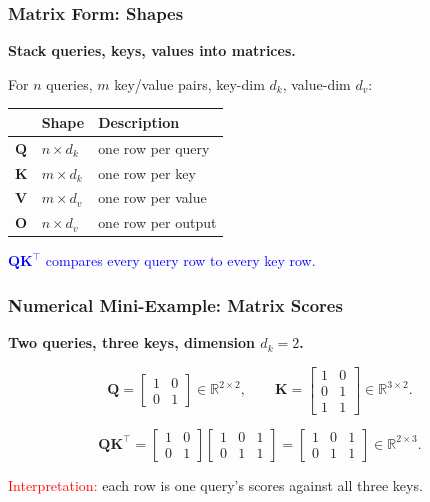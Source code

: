 \documentclass[notes,11pt, aspectratio=169]{beamer}
\newcommand{\vK}{\mathbf{K}}
\newcommand{\vQ}{\mathbf{Q}}
\newcommand{\vV}{\mathbf{V}}
\newcommand{\vO}{\mathbf{O}}
\newcommand{\R}{\mathbb{R}}
\begin{document}
\begin{frame}
\frametitle{Matrix Form: Shapes}

\textbf{Stack queries, keys, values into matrices.}

\vspace{6pt}
For $n$ queries, $m$ key/value pairs, key-dim $d_k$, value-dim $d_v$:

\vspace{4pt}
\begin{center}
\renewcommand{\arraystretch}{1.2}
\small
\begin{tabular}{l l l}
\toprule
& \textbf{Shape} & \textbf{Description} \\
\midrule
$\vQ$ & $n \times d_k$ & one row per query \\
$\vK$ & $m \times d_k$ & one row per key \\
$\vV$ & $m \times d_v$ & one row per value \\
$\vO$ & $n \times d_v$ & one row per output \\
\bottomrule
\end{tabular}
\end{center}

\vspace{8pt}
\textcolor{blue}{$\vQ\vK^\top$ compares every query row to every key row.}
\end{frame}

\begin{frame}
\frametitle{Numerical Mini-Example: Matrix Scores}

\textbf{Two queries, three keys, dimension $d_k = 2$.}

\vspace{4pt}
\[
    \vQ =
    \begin{bmatrix}
    1 & 0 \\
    0 & 1
    \end{bmatrix}
    \in \R^{2 \times 2},
    \qquad
    \vK =
    \begin{bmatrix}
    1 & 0 \\
    0 & 1 \\
    1 & 1
    \end{bmatrix}
    \in \R^{3 \times 2}.
\]

\vspace{2pt}
\[
    \vQ\vK^\top
    =
    \begin{bmatrix}
    1 & 0 \\
    0 & 1
    \end{bmatrix}
    \begin{bmatrix}
    1 & 0 & 1 \\
    0 & 1 & 1
    \end{bmatrix}
    =
    \begin{bmatrix}
    1 & 0 & 1 \\
    0 & 1 & 1
    \end{bmatrix}
    \in \R^{2 \times 3}.
\]

\textcolor{red}{Interpretation:} each row is one query's scores against all three keys.
\end{frame}
\end{document}
